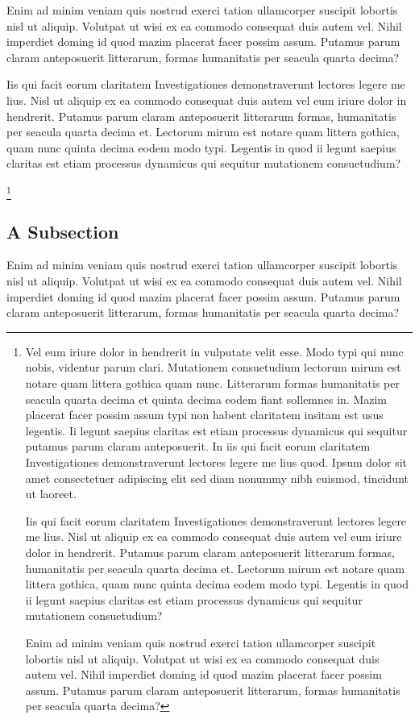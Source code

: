 \documentclass[a4paper,12pt]{scrartcl}
\begin{document}
Enim ad minim veniam quis nostrud exerci tation ullamcorper suscipit lobortis nisl ut aliquip. Volutpat ut wisi ex ea commodo consequat duis autem vel. Nihil imperdiet doming id quod mazim placerat facer possim assum. Putamus parum claram anteposuerit litterarum, formas humanitatis per seacula quarta decima?

Iis qui facit eorum claritatem Investigationes demonstraverunt lectores legere me lius. Nisl ut aliquip ex ea commodo consequat duis autem vel eum iriure dolor in hendrerit. Putamus parum claram anteposuerit litterarum formas, humanitatis per seacula quarta decima et. Lectorum mirum est notare quam littera gothica, quam nunc quinta decima eodem modo typi. Legentis in quod ii legunt saepius claritas est etiam processus dynamicus qui sequitur mutationem consuetudium?
 
\footnote{Vel eum iriure dolor in hendrerit in vulputate velit esse. Modo typi qui nunc nobis, videntur parum clari. Mutationem consuetudium lectorum mirum est notare quam littera gothica quam nunc. Litterarum formas humanitatis per seacula quarta decima et quinta decima eodem fiant sollemnes in. Mazim placerat facer possim assum typi non habent claritatem insitam est usus legentis. Ii legunt saepius claritas est etiam processus dynamicus qui sequitur putamus parum claram anteposuerit. In iis qui facit eorum claritatem Investigationes demonstraverunt lectores legere me lius quod. Ipsum dolor sit amet consectetuer adipiscing elit sed diam nonummy nibh euismod, tincidunt ut laoreet.

Iis qui facit eorum claritatem Investigationes demonstraverunt lectores legere me lius. Nisl ut aliquip ex ea commodo consequat duis autem vel eum iriure dolor in hendrerit. Putamus parum claram anteposuerit litterarum formas, humanitatis per seacula quarta decima et. Lectorum mirum est notare quam littera gothica, quam nunc quinta decima eodem modo typi. Legentis in quod ii legunt saepius claritas est etiam processus dynamicus qui sequitur mutationem consuetudium?

Enim ad minim veniam quis nostrud exerci tation ullamcorper suscipit lobortis nisl ut aliquip. Volutpat ut wisi ex ea commodo consequat duis autem vel. Nihil imperdiet doming id quod mazim placerat facer possim assum. Putamus parum claram anteposuerit litterarum, formas humanitatis per seacula quarta decima?}

\subsection{A Subsection}
Enim ad minim veniam quis nostrud exerci tation ullamcorper suscipit lobortis nisl ut aliquip. Volutpat ut wisi ex ea commodo consequat duis autem vel. Nihil imperdiet doming id quod mazim placerat facer possim assum. Putamus parum claram anteposuerit litterarum, formas humanitatis per seacula quarta decima?
\end{document}
